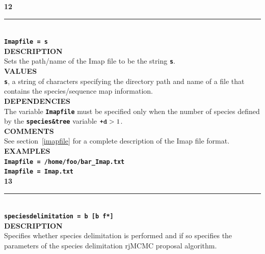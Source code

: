 \documentclass{book}
\numberwithin{equation}{section} \renewcommand{\baselinestretch}{0.55}
\begin{document}
\textbf{{\large 12}} \\
\noindent\rule{\textwidth}{0.8pt} \\
\textbf{{\Large \texttt{Imapfile = s}}} \vspace{5pt}\\
\textbf{DESCRIPTION} \vspace{5pt}\\
Sets the path/name of the Imap file to be the string \textbf{\texttt{s}}. \vspace{5pt}\\
\textbf{VALUES} \vspace{5pt}\\
\textbf{\texttt{s}}, a string of characters specifying the directory path and name of a file that contains the species/sequence map information. \vspace{5pt}\\
\textbf{DEPENDENCIES} \vspace{5pt}\\
The variable \textbf{\texttt{Imapfile}} must be specified only when the number of species defined by the \textbf{\texttt{species\&tree}} variable $\textbf{\texttt{+d}} > 1$. \vspace{5pt}\\
\textbf{COMMENTS} \vspace{5pt}\\
See section~\ref{imapfile} for a complete description of the Imap file format. \vspace{5pt} \\
\textbf{EXAMPLES} \vspace{5pt}\\
\textbf{\texttt{Imapfile = /home/foo/bar\_Imap.txt}} \vspace{5pt}\\
\textbf{\texttt{Imapfile = Imap.txt}} \vspace{10pt}\\
\textbf{{\large 13}} \\
\noindent\rule{\textwidth}{0.8pt} \\
\textbf{{\Large \texttt{speciesdelimitation = b [b f*]}}} \vspace{5pt}\\
\textbf{DESCRIPTION} \vspace{5pt}\\
Specifies whether species delimitation is performed and if so
specifies the parameters of the species delimitation rjMCMC proposal
algorithm. \vspace{5pt}\\
\end{document}
